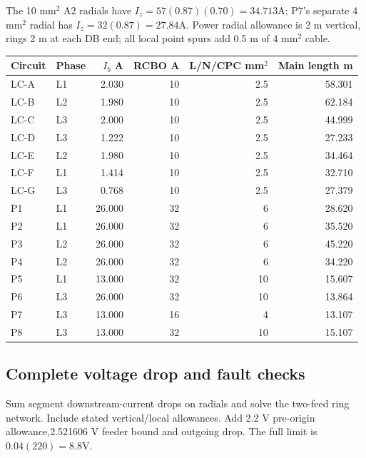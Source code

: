 The 10 mm$^2$ A2 radials have $I_z=57(0.87)(0.70)=34.713$A;  P7's separate 4 mm$^2$ radial has $I_z=32(0.87)=27.84$A. Power radial allowance is 2 m vertical, rings 2 m at each DB end;  all local point spurs add 0.5 m of 4 mm$^2$ cable.
\begin{longtable}{llrrrr}\toprule
Circuit & Phase & $I_b$ A & RCBO A & L/N/CPC mm$^2$ & Main length m\\\midrule\endhead

LC-A & L1 & 2.030 & 10 & 2.5 & 58.301 \\
LC-B & L2 & 1.980 & 10 & 2.5 & 62.184 \\
LC-C & L3 & 2.000 & 10 & 2.5 & 44.999 \\
LC-D & L3 & 1.222 & 10 & 2.5 & 27.233 \\
LC-E & L2 & 1.980 & 10 & 2.5 & 34.464 \\
LC-F & L1 & 1.414 & 10 & 2.5 & 32.710 \\
LC-G & L3 & 0.768 & 10 & 2.5 & 27.379 \\
P1 & L1 & 26.000 & 32 & 6 & 28.620 \\
P2 & L1 & 26.000 & 32 & 6 & 35.520 \\
P3 & L2 & 26.000 & 32 & 6 & 45.220 \\
P4 & L2 & 26.000 & 32 & 6 & 34.220 \\
P5 & L1 & 13.000 & 32 & 10 & 15.607 \\
P6 & L3 & 26.000 & 32 & 10 & 13.864 \\
P7 & L3 & 13.000 & 16 & 4 & 13.107 \\
P8 & L3 & 13.000 & 32 & 10 & 15.107 \\

\bottomrule\end{longtable}
\subsection*{Complete voltage drop and fault checks}
Sum segment downstream-current drops on radials and solve the two-feed ring network. Include stated vertical/local allowances. Add 2.2 V pre-origin allowance,2.521606 V feeder bound and outgoing drop. The full limit is $0.04(220)=8.8$V.

